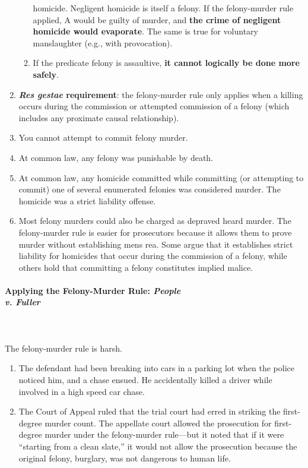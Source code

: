 \begin{enumerate}
\begin{enumerate}
        homicide. Negligent homicide is itself a felony. If the felony-murder 
        rule applied, A would be guilty of murder, and \textbf{the crime of 
        negligent homicide would evaporate}. The same is true for voluntary 
        manslaughter (e.g., with provocation).
        \item If the predicate felony is assaultive, \textbf{it cannot 
        logically be done more safely}.
    \end{enumerate}
    \item \textbf{\emph{Res gestae} requirement}: the felony-murder rule only 
    applies when a killing occurs during the commission or attempted 
    commission of a felony (which includes any proximate causal relationship).
    \item You cannot attempt to commit felony murder.
    \item At common law, any felony was punishable by death.
    \item At common law, any homicide committed while committing (or 
    attempting to commit) one of several enumerated felonies was considered 
    murder. The homicide was a strict liability offense.
    \item Most felony murders could also be charged as depraved heard murder. 
    The felony-murder rule is easier for prosecutors because it allows them to 
    prove murder without establishing mens rea. Some argue that it establishes 
    strict liability for homicides that occur during the commission of a 
    felony, while others hold that committing a felony constitutes implied 
    malice.
\end{enumerate}

\paragraph{Applying the Felony-Murder Rule: \emph{People\\v. Fuller}} 
~\\\\
The felony-murder rule is harsh.

\begin{enumerate}
    \item The defendant had been breaking into cars in a parking lot when the 
    police noticed him, and a chase ensued. He accidentally killed a driver 
    while involved in a high speed car chase.
    \item The Court of Appeal ruled that the trial court had erred in striking 
    the first-degree murder count. The appellate court allowed the prosecution 
    for first-degree murder under the felony-murder rule---but it noted that 
    if it were ``starting from a clean slate,'' it would not allow the 
    prosecution because the original felony, burglary, was not dangerous to 
    human life.
\end{enumerate}

